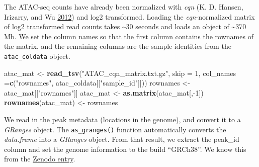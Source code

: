 \documentclass[
]{article}
\newenvironment{Shaded}{}{}
\newcommand{\DataTypeTok}[1]{\textcolor[rgb]{0.56,0.13,0.00}{#1}}
\newcommand{\DecValTok}[1]{\textcolor[rgb]{0.25,0.63,0.44}{#1}}
\newcommand{\KeywordTok}[1]{\textcolor[rgb]{0.00,0.44,0.13}{\textbf{#1}}}
\newcommand{\NormalTok}[1]{#1}
\newcommand{\OperatorTok}[1]{\textcolor[rgb]{0.40,0.40,0.40}{#1}}
\newcommand{\StringTok}[1]{\textcolor[rgb]{0.25,0.44,0.63}{#1}}
\begin{document}
The ATAC-seq counts have already been normalized with \emph{cqn} (K. D. Hansen, Irizarry, and Wu \protect\hyperlink{ref-Hansen2012}{2012}) and
log2 transformed. Loading the \emph{cqn}-normalized matrix of log2 transformed read
counts takes \textasciitilde30 seconds and loads an object of \textasciitilde370 Mb. We set the column
names so that the first column contains the rownames of the matrix, and the
remaining columns are the sample identities from the \texttt{atac\_coldata} object.

\begin{Shaded}
\begin{Highlighting}[]
\NormalTok{atac_mat <-}\StringTok{ }\KeywordTok{read_tsv}\NormalTok{(}\StringTok{"ATAC_cqn_matrix.txt.gz"}\NormalTok{,}
                     \DataTypeTok{skip =} \DecValTok{1}\NormalTok{,}
                     \DataTypeTok{col_names =}\KeywordTok{c}\NormalTok{(}\StringTok{"rownames"}\NormalTok{, atac_coldata[[}\StringTok{"sample_id"}\NormalTok{]]))}
\NormalTok{rownames <-}\StringTok{ }\NormalTok{atac_mat[[}\StringTok{"rownames"}\NormalTok{]]}
\NormalTok{atac_mat <-}\StringTok{ }\KeywordTok{as.matrix}\NormalTok{(atac_mat[,}\OperatorTok{-}\DecValTok{1}\NormalTok{])}
\KeywordTok{rownames}\NormalTok{(atac_mat) <-}\StringTok{ }\NormalTok{rownames}
\end{Highlighting}
\end{Shaded}

We read in the peak metadata (locations in the genome), and convert it to a
\emph{GRanges} object. The \texttt{as\_granges()} function automatically converts the
\emph{data.frame} into a \emph{GRanges} object. From that result, we extract the peak\_id
column and set the genome information to the build ``GRCh38''. We know this from
the \href{https://zenodo.org/record/1188300\#.XJOFSlNKiL5}{Zenodo entry}.

\begin{Shaded}
\end{Shaded}
\end{document}
